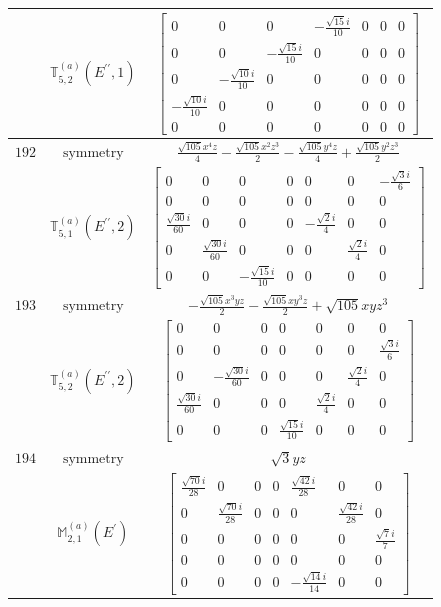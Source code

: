 \documentclass[fleqn,8pt,landscape]{jsarticle}
\begin{document}
\begin{longtable}{ccc}
$  $ & $ \mathbb{T}_{5,2}^{(a)}(E^{\prime\prime},1) $ & $ \begin{bmatrix} 0 & 0 & 0 & - \frac{\sqrt{15} i}{10} & 0 & 0 & 0 \\ 0 & 0 & - \frac{\sqrt{15} i}{10} & 0 & 0 & 0 & 0 \\ 0 & - \frac{\sqrt{10} i}{10} & 0 & 0 & 0 & 0 & 0 \\ - \frac{\sqrt{10} i}{10} & 0 & 0 & 0 & 0 & 0 & 0 \\ 0 & 0 & 0 & 0 & 0 & 0 & 0 \end{bmatrix} $ \\ \hline
$ 192 $ & $ \text{symmetry} $ & $ \frac{\sqrt{105} x^{4} z}{4} - \frac{\sqrt{105} x^{2} z^{3}}{2} - \frac{\sqrt{105} y^{4} z}{4} + \frac{\sqrt{105} y^{2} z^{3}}{2} $ \\
$  $ & $ \mathbb{T}_{5,1}^{(a)}(E^{\prime\prime},2) $ & $ \begin{bmatrix} 0 & 0 & 0 & 0 & 0 & 0 & - \frac{\sqrt{3} i}{6} \\ 0 & 0 & 0 & 0 & 0 & 0 & 0 \\ \frac{\sqrt{30} i}{60} & 0 & 0 & 0 & - \frac{\sqrt{2} i}{4} & 0 & 0 \\ 0 & \frac{\sqrt{30} i}{60} & 0 & 0 & 0 & \frac{\sqrt{2} i}{4} & 0 \\ 0 & 0 & - \frac{\sqrt{15} i}{10} & 0 & 0 & 0 & 0 \end{bmatrix} $ \\ \hline
$ 193 $ & $ \text{symmetry} $ & $ - \frac{\sqrt{105} x^{3} y z}{2} - \frac{\sqrt{105} x y^{3} z}{2} + \sqrt{105} x y z^{3} $ \\
$  $ & $ \mathbb{T}_{5,2}^{(a)}(E^{\prime\prime},2) $ & $ \begin{bmatrix} 0 & 0 & 0 & 0 & 0 & 0 & 0 \\ 0 & 0 & 0 & 0 & 0 & 0 & \frac{\sqrt{3} i}{6} \\ 0 & - \frac{\sqrt{30} i}{60} & 0 & 0 & 0 & \frac{\sqrt{2} i}{4} & 0 \\ \frac{\sqrt{30} i}{60} & 0 & 0 & 0 & \frac{\sqrt{2} i}{4} & 0 & 0 \\ 0 & 0 & 0 & \frac{\sqrt{15} i}{10} & 0 & 0 & 0 \end{bmatrix} $ \\ \hline
$ 194 $ & $ \text{symmetry} $ & $ \sqrt{3} y z $ \\
$  $ & $ \mathbb{M}_{2,1}^{(a)}(E^{\prime}) $ & $ \begin{bmatrix} \frac{\sqrt{70} i}{28} & 0 & 0 & 0 & \frac{\sqrt{42} i}{28} & 0 & 0 \\ 0 & \frac{\sqrt{70} i}{28} & 0 & 0 & 0 & \frac{\sqrt{42} i}{28} & 0 \\ 0 & 0 & 0 & 0 & 0 & 0 & \frac{\sqrt{7} i}{7} \\ 0 & 0 & 0 & 0 & 0 & 0 & 0 \\ 0 & 0 & 0 & 0 & - \frac{\sqrt{14} i}{14} & 0 & 0 \end{bmatrix} $ \\ \hline

\end{longtable}
\end{document}

